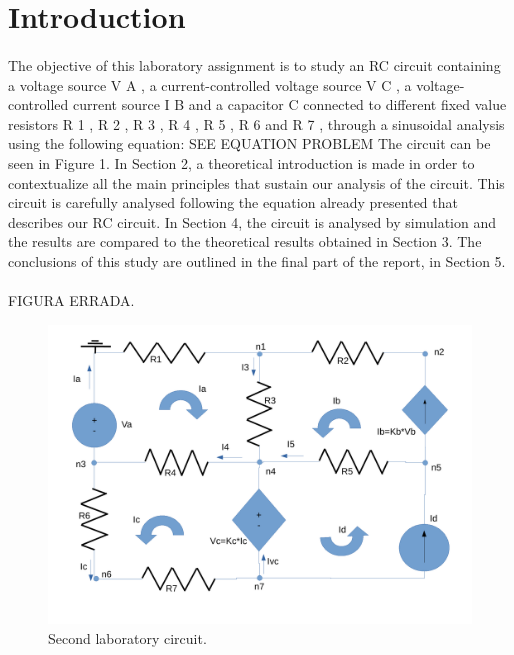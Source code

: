 \section{Introduction}
\label{sec:introduction}

\paragraph{} 
The objective of this laboratory assignment is to study an RC circuit containing a voltage source V A , a current-controlled voltage source V C , a voltage-controlled current source I B and a capacitor C connected to different fixed value resistors R 1 , R 2 , R 3 , R 4 , R 5 , R 6 and R 7 , through a sinusoidal analysis using the following equation: SEE EQUATION PROBLEM
The circuit
can be seen in Figure 1.
In Section 2, a theoretical introduction is made in order to contextualize all the main principles that sustain our analysis of the circuit. This circuit is carefully analysed following the equation already presented that describes our RC circuit. In Section 4, the circuit is analysed by simulation and the results are compared to the theoretical results obtained in Section 3. The conclusions of this study are outlined in the final part of the report, in Section 5.

\paragraph{}
FIGURA ERRADA.
\begin{figure}[h] \centering
\includegraphics[width=0.4\linewidth]{circuit.pdf}
\caption{Second laboratory circuit.}
\label{fig:circuit}
\end{figure}

